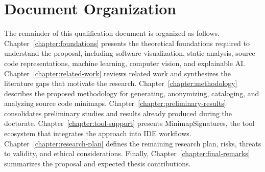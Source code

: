 \section{Document Organization}

The remainder of this qualification document is organized as follows.
Chapter~\ref{chapter:foundations} presents the theoretical foundations required
to understand the proposal, including software visualization, static analysis,
source code representations, machine learning, computer vision, and explainable
AI. Chapter~\ref{chapter:related-work} reviews related work and synthesizes the
literature gaps that motivate the research. Chapter~\ref{chapter:methodology}
describes the proposed methodology for generating, anonymizing, cataloging, and
analyzing source code minimaps. Chapter~\ref{chapter:preliminary-results}
consolidates preliminary studies and results already produced during the
doctorate. Chapter~\ref{chapter:tool-support} presents MinimapSignatures, the
tool ecosystem that integrates the approach into IDE workflows.
Chapter~\ref{chapter:research-plan} defines the remaining research plan, risks,
threats to validity, and ethical considerations. Finally,
Chapter~\ref{chapter:final-remarks} summarizes the proposal and expected thesis
contributions.
